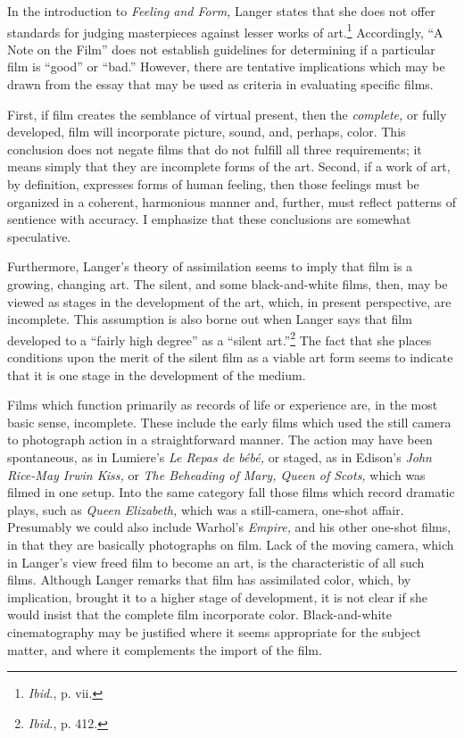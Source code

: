 \documentclass{tufte-handout}
\begin{document}
In the introduction to \emph{Feeling and Form,} Langer states that she
does not offer standards for judging masterpieces against lesser works
of art.\footnote{\emph{Ibid.}, p. vii.} Ac­cordingly, ``A Note on the
Film'' does not establish guidelines for deter­mining if a particular
film is ``good'' or ``bad.'' However, there are tentative implications
which may be drawn from the essay that may be used as cri­teria in
evaluating specific films.

First, if film creates the semblance of virtual present, then the
\emph{complete,} or fully developed, film will incorporate picture,
sound, and, perhaps, color. This conclusion does not negate films that
do not fulfill all three re­quirements; it means simply that they are
incomplete forms of the art. Second, if a work of art, by definition,
expresses forms of human feeling, then those feelings must be organized
in a coherent, harmonious manner and, further, must reflect patterns of
sentience with accuracy. I emphasize that these conclusions are somewhat
speculative.

Furthermore, Langer's theory of assimilation seems to imply that film is
a growing, changing art. The silent, and some black-and-white films,
then, may be viewed as stages in the development of the art, which, in
present perspective, are incomplete. This assumption is also borne out
when Langer says that film developed to a ``fairly high degree'' as a
``silent art.''\footnote{\emph{Ibid.}, p. 412.} The fact that she places
conditions upon the merit of the silent film as a viable art form seems
to indicate that it is one stage in the development of the medium.

Films which function primarily as records of life or experience are, in
the most basic sense, incomplete. These include the early films which
used the still camera to photograph action in a straightforward manner.
The action may have been spontaneous, as in Lumiere's \emph{Le Repas de
bébé,} or staged, as in Edison's \emph{John Rice-May Irwin Kiss,} or
\emph{The Beheading of Mary, Queen of Scots,} which was filmed in one
setup. Into the same category fall those films which record dramatic
plays, such as \emph{Queen Elizabeth,} which was a still-camera,
one-shot affair. Presumably we could also include War­hol's
\emph{Empire,} and his other one-shot films, in that they are basically
photo­graphs on film. Lack of the moving camera, which in Langer's view
freed film to become an art, is the characteristic of all such films.
Although Lan­ger remarks that film has assimilated color, which, by
implication, brought it to a higher stage of development, it is not
clear if she would insist that the complete film incorporate color.
Black-and-white cinematography may be justified where it seems
appropriate for the subject matter, and where it complements the import
of the film.
\end{document}
